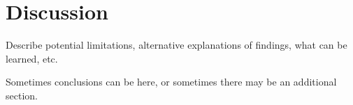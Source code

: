 \section{Discussion}\label{sec:discussion}

Describe potential limitations, alternative explanations of findings, what can
be learned, etc.

Sometimes conclusions can be here, or sometimes there may be an additional
section.
